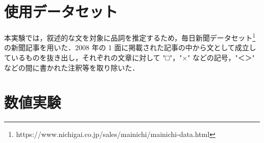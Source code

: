 \documentclass[twocolumn]{jarticle}
\begin{document}







\section{使用データセット}
本実験では，叙述的な文を対象に品詞を推定するため，毎日新聞データセット\footnote{https://www.nichigai.co.jp/sales/mainichi/mainichi-data.html}の新聞記事を用いた．2008 年の 1 面に掲載された記事の中から文として成立しているものを抜き出し，それぞれの文章に対して "□"，"×" などの記号，"＜＞" などの間に書かれた注釈等を取り除いた．
　




\section{数値実験}
\end{document}
